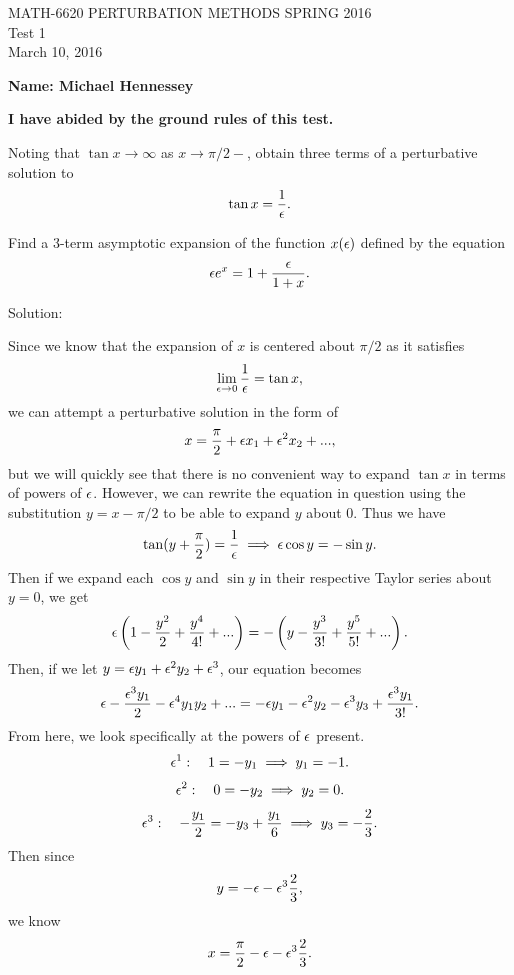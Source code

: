 


\begin{center}
\large{ MATH-6620 \hspace{1in}  PERTURBATION METHODS \hspace{1in}SPRING 2016\\ Test 1 \\ March 10, 2016}\end{center}


\vspace{6 ex}

{\bf Name: Michael Hennessey} \hfill

\vspace{6 ex}
\textbf{I have abided by the ground rules of this test.}
\vspace {6 ex}

 \ec

\benum
\item
\benum
\item Noting that $\tan{x}\to\infty$ as $x\to \pi/2 -$, obtain three terms of a perturbative solution to 
$$\tan{x}=\frac{1}{\epsilon}.$$

\item Find a 3-term asymptotic expansion of the function $x(\epsilon)$ defined by the equation
$$\epsilon e^x=1+\frac{\epsilon}{1+x}.$$
\eenum

Solution:\\

\benum
\item Since we know that the expansion of $x$ is centered about $\pi/2$ as it satisfies
$$\lim_{\epsilon\to 0}\frac{1}{\epsilon}=\tan x,$$
we can attempt a perturbative solution in the form of
$$x=\frac{\pi}{2}+\epsilon x_1+\epsilon^2 x_2+...,$$
but we will quickly see that there is no convenient way to expand $\tan x$ in terms of powers of $\epsilon$. However, we can rewrite the equation in question using the substitution $y=x-\pi/2$ to be able to expand $y$ about $0.$ Thus we have
$$\tan(y+\frac{\pi}{2})=\frac{1}{\epsilon}\implies \epsilon\cos y=-\sin y.$$
Then if we expand each $\cos y$ and $\sin y$ in their respective Taylor series about $y=0$, we get
$$\epsilon\left(1-\frac{y^2}{2}+\frac{y^4}{4!}+...\right)=-\left(y-\frac{y^3}{3!}+\frac{y^5}{5!}+...\right).$$
Then, if we let $y=\epsilon y_1+\epsilon^2 y_2+\epsilon^3$, our equation becomes
$$\epsilon-\frac{\epsilon^3 y_1}{2}-\epsilon^4y_1y_2+...=-\epsilon y_1-\epsilon^2 y_2-\epsilon^3 y_3+\frac{\epsilon^3y_1}{3!}.$$
From here, we look specifically at the powers of $\epsilon$ present.
$$\epsilon^1:\quad 1=-y_1\implies y_1=-1.$$
$$\epsilon^2:\quad 0=-y_2\implies y_2=0.$$
$$\epsilon^3:\quad -\frac{y_1}{2}=-y_3+\frac{y_1}{6}\implies y_3=-\frac{2}{3}.$$
Then since 
$$y=-\epsilon-\epsilon^3\frac{2}{3},$$
we know
$$x=\frac{\pi}{2}-\epsilon-\epsilon^3\frac{2}{3}.$$

